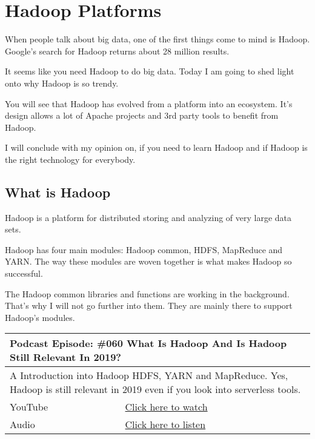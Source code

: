 \documentclass[12pt, numbers=noenddot]{scrreprt} %
\begin{document}
\chapter{Hadoop Platforms}
When people talk about big data, one of the first things come to mind is Hadoop. Google’s search for Hadoop returns about 28 million results.

It seems like you need Hadoop to do big data. Today I am going to shed light onto why Hadoop is so trendy.

You will see that Hadoop has evolved from a platform into an ecosystem. It’s design allows a lot of Apache projects and 3rd party tools to benefit from Hadoop.

I will conclude with my opinion on, if you need to learn Hadoop and if Hadoop is the right technology for everybody.

\section{What is Hadoop}

Hadoop is a platform for distributed storing and analyzing of very large data sets.

Hadoop has four main modules: Hadoop common, HDFS, MapReduce and YARN. The way these modules are woven together is what makes Hadoop so successful.

The Hadoop common libraries and functions are working in the background. That’s why I will not go further into them. They are mainly there to support Hadoop’s modules.

\begin{table}[h]
\begin{tabular}{ll}
\hline
\multicolumn{2}{l}{\textbf{Podcast Episode:} \#060 What Is Hadoop And Is Hadoop Still Relevant In 2019?} \\ \hline
\multicolumn{2}{p{15cm}}{A Introduction into Hadoop HDFS, YARN and MapReduce. Yes, Hadoop is still relevant in 2019 even if you look into serverless tools. }         \\ \hline
\multicolumn{1}{l|}{YouTube}   & \href{https://youtu.be/8AWaht3YQgo}{Click here to watch}   \\ 
\multicolumn{1}{l|}{Audio}     & \href{https://anchor.fm/andreaskayy/episodes/060-What-Is-Hadoop-And-Is-Hadoop-Still-Relevant-In-2019-e45ijp}{Click here to listen}   \\ \hline
\end{tabular}
\end{table}
\end{document}

